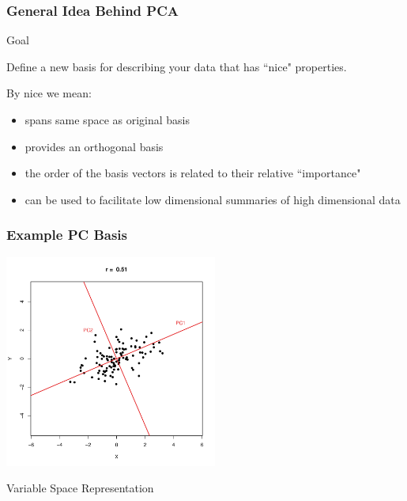 \documentclass{beamer}
\begin{document}
\begin{frame}
  \frametitle{General Idea Behind PCA}


\begin{block}{Goal}

Define a new basis for describing your data that has ``nice" properties.

\end{block}
\medskip

By nice we mean:
\begin{itemize}
	\item spans same space as original basis
	\item provides an orthogonal basis
	\item the order of the basis vectors is related to their relative ``importance"
	\item can be used to facilitate low dimensional summaries of high dimensional data
\end{itemize}


\end{frame}



\begin{frame}
  \frametitle{Example PC Basis}

\begin{center}
\includegraphics[height=2.75in]{fig-bivariate-pca.pdf}
\smallskip

Variable Space Representation

\end{center}  


\end{frame}
\end{document}
